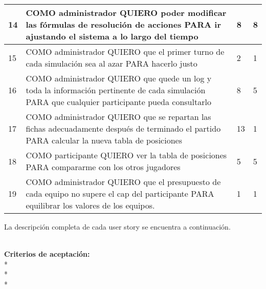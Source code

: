 \begin{center}
\begin{tabular}{| l | p{10cm} | l | l | }
14 & COMO administrador QUIERO poder modificar las fórmulas de resolución de acciones PARA ir ajustando el sistema a lo largo del tiempo & 8 & 8\\  \hline
15 & COMO administrador QUIERO que el primer turno de cada simulación sea al azar PARA hacerlo justo & 2 & 1\\  \hline
16 & COMO administrador QUIERO que quede un log y toda la información pertinente de cada simulación PARA que cualquier participante pueda consultarlo & 8 & 5\\  \hline
17 & COMO administrador QUIERO que se repartan las fichas adecuadamente después de terminado el partido PARA calcular la nueva tabla de posiciones & 13 & 1\\  \hline
18 & COMO participante QUIERO ver la tabla de posiciones PARA compararme con los otros jugadores & 5 & 5\\  \hline
19 & COMO administrador QUIERO que el presupuesto de cada equipo no supere el cap del participante PARA equilibrar los valores de los equipos. & 1 & 1\\  \hline
  \end{tabular}
\end{center}

La descripción completa de cada user story se encuentra a continuación.

\userStory     {} %
       {} %
       {       \\
       \textbf{Criterios de aceptación:}\\
               * \\
               * \\
               * \\
       } %
       {} %
       {} %
       {} %
       {} %
       {} %


\vspace{20pt}







